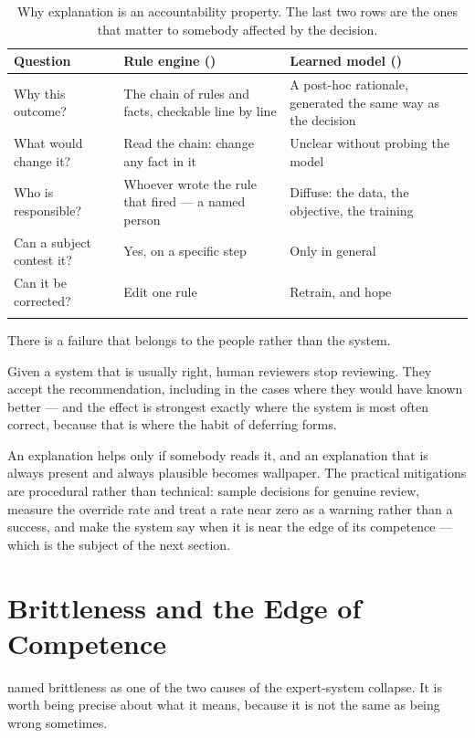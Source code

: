 \smallskip
\noindent\begin{longtable}{@{}L{3.4cm}L{5.5cm}L{5.6cm}@{}}
\toprule
{}
\textbf{Question} & \textbf{Rule engine ()} &
\textbf{Learned model ()} \\
\midrule
\endhead
Why this outcome? & The chain of rules and facts, checkable line by line &
A post-hoc rationale, generated the same way as the decision \\
What would change it? & Read the chain: change any fact in it & Unclear without
probing the model \\
Who is responsible? & Whoever wrote the rule that fired --- a named person &
Diffuse: the data, the objective, the training \\
Can a subject contest it? & Yes, on a specific step & Only in general \\
Can it be corrected? & Edit one rule & Retrain, and hope \\
\bottomrule
\caption{Why explanation is an accountability property. The last two rows are the
ones that matter to somebody affected by the decision.}\label{tab:explain}
\end{longtable}

\begin{alertbox}
There is a failure that belongs to the people rather than the system.

Given a system that is usually right, human reviewers stop reviewing. They accept
the recommendation, including in the cases where they would have known better ---
and the effect is strongest exactly where the system is most often correct, because
that is where the habit of deferring forms.

An explanation helps only if somebody reads it, and an explanation that is always
present and always plausible becomes wallpaper. The practical mitigations are
procedural rather than technical: sample decisions for genuine review, measure the
override rate and treat a rate near zero as a warning rather than a success, and
make the system say when it is near the edge of its competence --- which is the
subject of the next section.
\end{alertbox}

\section{Brittleness and the Edge of Competence}

 named brittleness as one of the two causes of the expert-system
collapse. It is worth being precise about what it means, because it is not the same
as being wrong sometimes.

